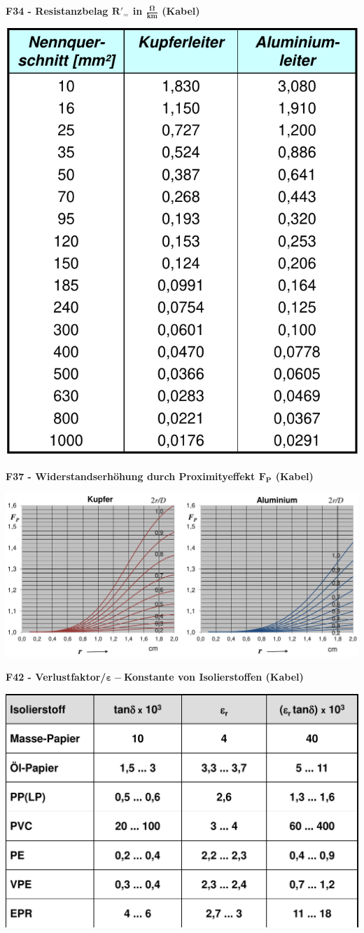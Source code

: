 \newpage


\textbf{F34 - Resistanzbelag $\mathbf{R'_{=}}$ in $\mathbf{\frac{\Omega}{km}}$ (Kabel)}

\includegraphics[width=0.35\columnwidth]{figures/f34_Kabel_Gleichstromwiderstand.png}

\textbf{F37 - Widerstandserhöhung durch Proximityeffekt $\mathbf{F_P}$ (Kabel)}

\includegraphics[width=0.96\columnwidth]{figures/F37_Kabel_Resistanzbelag_Proximityeffekt.png}


\textbf{F42 - Verlustfaktor/$\mathbf{\varepsilon-}$Konstante von Isolierstoffen (Kabel)}

\includegraphics[width=0.5\columnwidth]{figures/f42_verlustfaktor_e-konstante_isostoffe.png}

